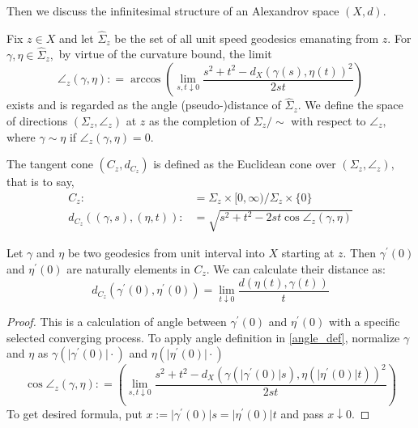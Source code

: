 Then we discuss the infinitesimal structure of an Alexandrov space \( ( X , d )\).

\begin{defn}
	Fix \( z \in X \) and let \( \hat { \Sigma } _ { z } \) be the set of all unit speed geodesics emanating from \( z \). For \( \gamma , \eta \in \hat { \Sigma } _ { z } , \) by virtue of the curvature bound, the limit
	\begin{equation}
		\label{angle_def}
		\angle _ { z } ( \gamma , \eta ): = \arccos \left( \lim _ { s , t \downarrow 0 } \frac { s ^ { 2 } + t ^ { 2 } - d _ { X }\left( \gamma ( s ) , \eta ( t ) \right) ^ { 2 } } { 2 s t } \right)
	\end{equation}
	exists and is regarded as the angle (pseudo-)distance of \( \hat { \Sigma } _ { z } . \) We define the space of directions \( \left( \Sigma _ { z } , \angle _ { z } \right) \) at \( z \) as the completion of \( \Sigma _ { z } / \sim \) with respect to \( \angle _ { z } , \) where \( \gamma \sim \eta \) if \( \angle _ { z } ( \gamma , \eta ) = 0 . \)
\end{defn}

\begin{defn}
	The tangent cone \( \left( C _ { z } , d _ { C _ { z } } \right) \) is defined as the Euclidean cone over \( \left( \Sigma _ { z } , \angle _ { z } \right) , \)
	that is to say,
	\begin{align*}
		C _ { z }:                                           & = \Sigma _ { z } \times [ 0 , \infty ) / \Sigma _ { z } \times \{ 0 \}          \\
		d _ { C _ { z } } ( ( \gamma , s ) , ( \eta , t ) ): & = \sqrt { s ^ { 2 } + t ^ { 2 } - 2 s t \cos \angle _ { z } ( \gamma , \eta ) }
	\end{align*}
\end{defn}

\begin{thm}
	Let $\gamma$ and  $\eta$ be two geodesics from unit interval into $X$ starting at $z$.  Then $\gamma^\prime(0)$ and $\eta^\prime(0)$ are naturally elements in $C_z$.  We can calculate their distance as:
	\[  d_{C_z}(\gamma^\prime(0),\eta^\prime(0))=\lim _ { t \downarrow 0 } \frac  {d ( \eta ( t ) , \gamma ( t ) )  }{ t }\]
\end{thm}

\begin{proof}
	This is a calculation of angle between $\gamma^\prime(0)$ and $\eta^\prime(0)$ with a specific selected converging process. To apply angle definition in \cref{angle_def}, normalize $\gamma$ and $\eta$ as $\gamma\left(\vert\gamma^\prime(0)\vert \cdot\right)$ and $\eta\left(\vert\eta^\prime(0)\vert \cdot\right)$
	\[
		\cos\angle _ { z } ( \gamma , \eta ): = \left( \lim _ { s , t \downarrow 0 } \frac { s ^ { 2 } + t ^ { 2 } - d _ { X }\left( \gamma (\vert \gamma^\prime(0)\vert s ) , \eta (\vert \eta^\prime(0)\vert  t ) \right) ^ { 2 } } { 2 s t } \right)
	\]
	To get desired formula, put $ x := \vert  \gamma^\prime(0)\vert s =\vert \eta^\prime(0)\vert t $ and pass $x \downarrow 0$.
\end{proof}

